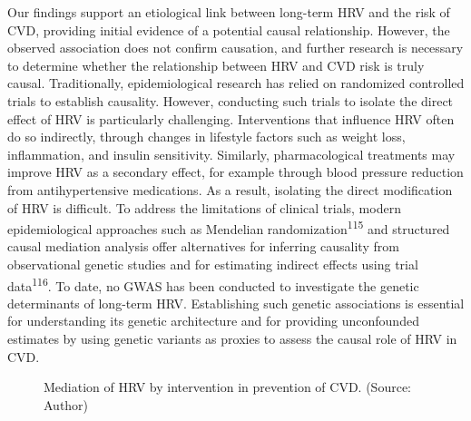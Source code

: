 \documentclass[
  a4paper,
  headsepline=true,
  open=any]{scrbook}
\begin{document}
Our findings support an etiological link between long-term HRV and the
risk of CVD, providing initial evidence of a potential causal
relationship. However, the observed association does not confirm
causation, and further research is necessary to determine whether the
relationship between HRV and CVD risk is truly causal. Traditionally,
epidemiological research has relied on randomized controlled trials to
establish causality. However, conducting such trials to isolate the
direct effect of HRV is particularly challenging. Interventions that
influence HRV often do so indirectly, through changes in lifestyle
factors such as weight loss, inflammation, and insulin sensitivity.
Similarly, pharmacological treatments may improve HRV as a secondary
effect, for example through blood pressure reduction from
antihypertensive medications. As a result, isolating the direct
modification of HRV is difficult. To address the limitations of clinical
trials, modern epidemiological approaches such as Mendelian
randomization\textsuperscript{115} and structured causal mediation
analysis offer alternatives for inferring causality from observational
genetic studies and for estimating indirect effects using trial
data\textsuperscript{116}. To date, no GWAS has been conducted to
investigate the genetic determinants of long-term HRV. Establishing such
genetic associations is essential for understanding its genetic
architecture and for providing unconfounded estimates by using genetic
variants as proxies to assess the causal role of HRV in CVD.

\begin{figure}

\begin{minipage}[t]{\linewidth}

{\centering 


\caption{Mediation of HRV by intervention in prevention of CVD. (Source:
Author)}

}

\end{minipage}%

\end{figure}
\end{document}
